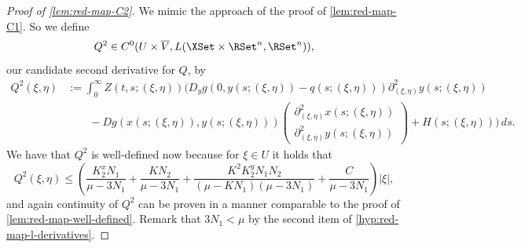 \documentclass[a4paper]{siamart190516}
\begin{document}
\begin{proof}[Proof of \cref{lem:red-map-C2}]
We mimic the approach of the proof of \cref{lem:red-map-C1}. So we define
\[
Q^2 \in C^0(U \times \overline{V}, L(\XSet \times \RSet^n, \RSet^n)),
\]
our candidate second derivative for $Q$, by
\begin{align*}
Q^2(\xi,\eta) &:=  \int_0^{\infty} Z(t,s; (\xi,\eta)) \Bigg( D_y g(0,y(s;(\xi,\eta)) - q(s;(\xi,\eta))) \partial^2_{(\xi,\eta)}y(s; (\xi,\eta))  \\
&\qquad - D g(x(s;(\xi,\eta)),y(s;(\xi,\eta))) \begin{pmatrix} \partial^2_{(\xi,\eta)}x(s; (\xi,\eta)) \\ \partial^2_{(\xi,\eta)}y(s; (\xi,\eta)) \end{pmatrix} + H(s;(\xi,\eta)) \Bigg) \, ds.
\end{align*}
We have that $Q^2$ is well-defined now because for $\xi \in U$ it holds that
\[
Q^2(\xi,\eta) \leq \left( \frac{K^x_2 N_1}{\mu -  3 N_1} + \frac{K N_2 }{\mu - 3N_1} + \frac{K^2 K^y_2 N_1 N_2}{(\mu - K N_1)(\mu - 3 N_1)} + \frac{C}{\mu-3N_1}   \right) |\xi|,
\]
and again continuity of $Q^2$ can be proven in a manner comparable to the proof of \cref{lem:red-map-well-defined}. Remark that $3 N_1 < \mu$ by the second item of \cref{hyp:red-map-l-derivatives}.


\end{proof}
\end{document}

